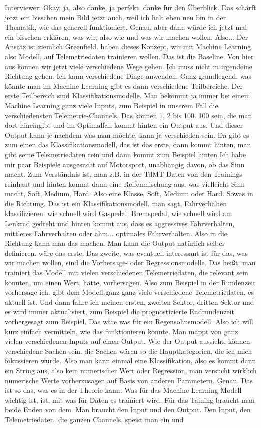 Interviewer: 
Okay, ja, also danke, ja perfekt, danke für den Überblick. Das schärft jetzt ein bisschen mein Bild jetzt auch, weil ich halt eben neu bin in der Thematik, wie das generell funktioniert. Genau, aber dann würde ich jetzt mal ein bisschen erklären, was wir, also wie und was wir machen wollen. Also...  Der Ansatz ist ziemlich Greenfield. haben dieses Konzept,  wir mit Machine Learning, also Modell, auf Telemetriedaten trainieren wollen. Das ist die Baseline. Von hier aus können wir jetzt viele verschiedene Wege gehen. Ich muss nicht in irgendeine Richtung gehen. Ich kann verschiedene Dinge anwenden.  Ganz grundlegend, was könnte man  im Machine Learning gibt es dann verschiedene Teilbereiche. Der erste Teilbereich sind Klassifikationsmodelle. Man bekommt ja immer bei einem Machine Learning ganz viele Inputs, zum Beispiel in unserem Fall die verschiedensten Telemetrie-Channels. Das können 1, 2 bis 100. 100 sein, die man dort hineingibt und im Optimalfall kommt hinten ein Output aus.  Und dieser Output kann je nachdem was man möchte, kann ja verschieden sein. Da gibt es zum einen das Klassifikationsmodell, das ist das erste, dann kommt hinten, man gibt seine Telemetriedaten rein und dann kommt zum Beispiel hinten   Ich habe mir paar Beispiele ausgesucht auf Motorsport, unabhängig davon, ob das  Sinn macht. Zum Verständnis ist, man z.B. in der TdMT-Daten von den Trainings reinhaut und hinten kommt dann eine Reifenmischung aus, was vielleicht Sinn macht, Soft, Medium, Hard. Also  eine Klasse, Soft, Medium oder Hard. Sowas  in die Richtung. Das ist ein Klassifikationsmodell. man sagt, Fahrverhalten klassifizieren.  wie schnell wird Gaspedal, Bremspedal, wie schnell wird am Lenkrad gedreht und hinten kommt aus, dass es aggressives Fahrverhalten, mittleres Fahrverhalten oder ähm...   optimales Fahrverhalten. Also in die Richtung kann man das machen. Man kann die Output natürlich selber definieren.  wäre das erste. Das zweite, was eventuell interessant ist für das, was wir machen wollen, sind die Vorhersage- oder Regressionsmodelle. Das heißt, man trainiert das Modell mit vielen verschiedenen Telemetriedaten, die relevant sein könnten, um einen Wert, hätte,   vorhersagen. Also zum Beispiel in der Rundenzeit vorhersage ich.  gibt dem Modell ganz ganz viele verschiedene Telemetriedaten, es aktuell ist. Und dann fahre ich meinen ersten, zweiten Sektor, dritten Sektor und es wird immer aktualisiert, zum Beispiel die prognostizierte Endrundenzeit vorhergesagt zum Beispiel. Das wäre was für ein Regensohnsmodell. Also ich will kurz einfach vermitteln, wie das funktionieren könnte. Man mappt von ganz vielen verschiedenen Inputs auf einen Output. Wie der Output aussieht,  können verschiedene Sachen sein.  die Sachen wären so die Hauptkategorien,  die ich mich fokussieren würde. Also man kann einmal eine Klassifikation, also es kommt dann ein String aus, also kein numerischer Wert oder Regression, man versucht wirklich numerische Werte vorherzusagen auf Basis von anderen Parametern. Genau. Das ist so das, was es in der Theorie kann.  Was für das Machine Learning Modell wichtig ist, ist, mit was für Daten es trainiert wird.  Für das Taining braucht man beide Enden  von dem. Man braucht den Input und den Output. Den Input, den Telemetriedaten, die ganzen Channels, speist man ein und 